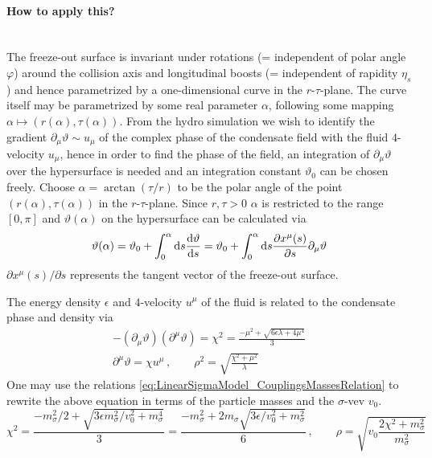% 

\paragraph*{How to apply this?}\mbox{}\\

The freeze-out surface is invariant under rotations (= independent of polar angle $\varphi$) around the collision axis and longitudinal boosts (= independent of rapidity $\eta_s$) and hence parametrized by a one-dimensional curve in the $r\text{-}\tau$-plane. The curve itself may be parametrized by some real parameter $\alpha$, following some mapping $\alpha\mapsto (r(\alpha),\tau(\alpha))$. From the hydro simulation we wish to identify the gradient $\partial_\mu\vartheta\sim u_\mu$ of the complex phase of the condensate field with the fluid $4$-velocity $u_\mu$, hence in order to find the phase of the field, an integration of $\partial_\mu\vartheta$ over the hypersurface is needed and an integration constant $\vartheta_0$ can be chosen freely. Choose $\alpha=\arctan(\tau/r)$ to be the polar angle of the point $(r(\alpha),\tau(\alpha))$ in the $r\text{-}\tau$-plane. Since $r,\tau>0$ $\alpha$ is restricted to the range $[0,\pi]$ and $\vartheta(\alpha)$ on the hypersurface can be calculated via
\begin{equation}
    \vartheta(\alpha)=\vartheta_0+\int_0^\alpha\text{d} s\frac{\text{d}\vartheta}{\text{d} s}=\vartheta_0+\int_0^\alpha\text{d} s\frac{\partial x^\mu(s)}{\partial s}\partial_\mu\vartheta
    \label{eq:FluidsToFields_complexPhase}
\end{equation}
$\partial x^\mu(s)/\partial s$ represents the tangent vector of the freeze-out surface.

The energy density $\epsilon$ and $4$-velocity $u^\mu$ of the fluid is related to the condensate phase and density via
\begin{subequations}
    \begin{gather}
        -(\partial_\mu\vartheta)(\partial^\mu\vartheta)=\chi^2=\frac{-\mu^2+\sqrt{6\epsilon\lambda+4\mu^4}}{3}\\
        \partial^\mu\vartheta=\chi u^\mu\,,\qquad\rho^2=\sqrt{\frac{\chi^2+\mu^2}{\lambda}}
    \end{gather}
\end{subequations}
One may use the relations \eqref{eq:LinearSigmaModel_CouplingsMassesRelation} to rewrite the above equation in terms of the particle masses and the $\sigma$-vev $v_0$.
\begin{equation}
    \chi^2=\frac{-m_\sigma^2/2+\sqrt{3\epsilon m_\sigma^2/v_0^2+m_\sigma^4}}{3}=\frac{-m_\sigma^2+2m_\sigma\sqrt{3\epsilon/v_0^2+m_\sigma^2}}{6}\,,\qquad\rho=\sqrt{v_0\frac{2\chi^2+m_\sigma^2}{m_\sigma^2}}
\end{equation}

